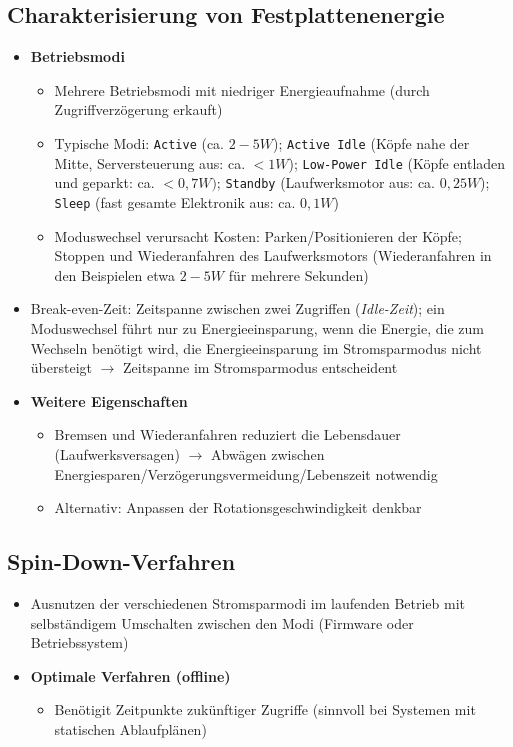 \subsection{Charakterisierung von Festplattenenergie}
\begin{itemize}
	\item \textbf{Betriebsmodi}
	\begin{itemize}
		\item Mehrere Betriebsmodi mit niedriger Energieaufnahme (durch Zugriffverzögerung erkauft)
		\item Typische Modi: \texttt{Active} (ca. \(2-5W\)); \texttt{Active Idle} (Köpfe nahe der Mitte, Serversteuerung aus: ca. \(<1W\)); \texttt{Low-Power Idle} (Köpfe entladen und geparkt: ca. \(<0,7W)\); \texttt{Standby} (Laufwerksmotor aus: ca. \(0,25W\)); \texttt{Sleep} (fast gesamte Elektronik aus: ca. \(0,1W\))
		\item Moduswechsel verursacht Kosten: Parken/Positionieren der Köpfe; Stoppen und Wiederanfahren des Laufwerksmotors (Wiederanfahren in den Beispielen etwa \(2-5W\) für mehrere Sekunden)
	\end{itemize}
	\item Break-even-Zeit: Zeitspanne zwischen zwei Zugriffen (\textit{Idle-Zeit}); ein Moduswechsel führt nur zu Energieeinsparung, wenn die Energie, die zum Wechseln benötigt wird, die Energieeinsparung im Stromsparmodus nicht übersteigt \(\rightarrow\) Zeitspanne im Stromsparmodus entscheident
	\item \textbf{Weitere Eigenschaften}
	\begin{itemize}
		\item Bremsen und Wiederanfahren reduziert die Lebensdauer (Laufwerksversagen) \(\rightarrow\) Abwägen zwischen Energiesparen/Verzögerungsvermeidung/Lebenszeit notwendig
		\item Alternativ: Anpassen der Rotationsgeschwindigkeit denkbar
	\end{itemize}
\end{itemize}


\subsection{Spin-Down-Verfahren}
\begin{itemize}
	\item Ausnutzen der verschiedenen Stromsparmodi im laufenden Betrieb mit selbständigem Umschalten zwischen den Modi (Firmware oder Betriebssystem)
	\item \textbf{Optimale Verfahren (offline)}
	\begin{itemize}
		\item Benötigit Zeitpunkte zukünftiger Zugriffe (sinnvoll bei Systemen mit statischen Ablaufplänen)
	\end{itemize}
\end{itemize}


